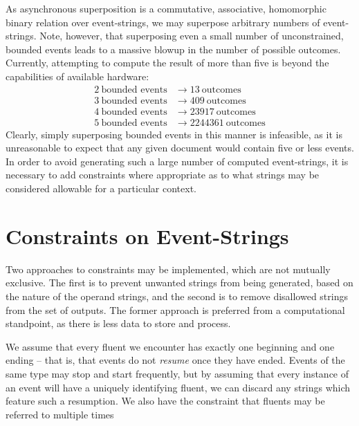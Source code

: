 \documentclass[a4paper,11pt]{article}
\begin{document}
As asynchronous superposition is a commutative, associative, homomorphic binary 
relation over \iffalse{}well-formed\fi{}event-strings, we may superpose 
arbitrary numbers of event-strings. Note, however, that superposing even a 
small number of unconstrained, bounded events leads to a massive blowup in the 
number of possible outcomes. Currently, attempting to compute the result of 
more than five is beyond the capabilities of available hardware:
\begin{align*}
2 ~\mbox{bounded events} &\to 13 ~\mbox{outcomes}\\
3 ~\mbox{bounded events} &\to 409 ~\mbox{outcomes}\\
4 ~\mbox{bounded events} &\to 23917 ~\mbox{outcomes}\\
5 ~\mbox{bounded events} &\to 2244361 ~\mbox{outcomes}
\end{align*}
Clearly, simply superposing bounded events in this manner is infeasible, as it 
is unreasonable to expect that any given document would contain five or less 
events. In order to avoid generating such a large number of computed 
event-strings, it is necessary to add constraints where appropriate as to what 
strings may be considered allowable for a particular context.

\section{Constraints on Event-Strings}
Two approaches to constraints may be implemented, which are not mutually 
exclusive. The first is to prevent unwanted strings from being generated, based 
on the nature of the operand strings, and the second is to remove disallowed 
strings from the set of outputs. The former approach is preferred from a 
computational standpoint, as there is less data to store and process.

We assume that every fluent we encounter has exactly one beginning and one 
ending -- that is, that events do not \textit{resume} once they have ended. 
Events of the same type may stop and start frequently, but by assuming that 
every instance of an event will have a uniquely identifying fluent, we can 
discard any strings which feature such a resumption. We also have the 
constraint that fluents may be referred to multiple times


{}

\end{document}
